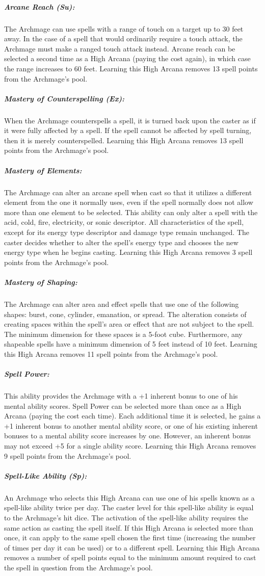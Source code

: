 \subparagraph{Arcane Reach (Su):}
The Archmage can use spells with a range of touch on a target up to 30 feet away. 
In the case of a spell that would ordinarily require a touch attack, the Archmage must make a ranged touch attack instead.
Arcane reach can be selected a second time as a High Arcana (paying the cost again), in which case the range increases to 60 feet. 
Learning this High Arcana removes 13 spell points from the Archmage's pool.

\subparagraph{Mastery of Counterspelling (Ex):}
When the Archmage counterspells a spell, it is turned back upon the caster as if it were fully affected by a  spell. 
If the spell cannot be affected by spell turning, then it is merely counterspelled. 
Learning this High Arcana removes 13 spell points from the Archmage's pool.

\subparagraph{Mastery of Elements:}
The Archmage can alter an arcane spell when cast so that it utilizes a different element from the one it normally uses, 
even if the spell normally does not allow more than one element to be selected. 
This ability can only alter a spell with the acid, cold, fire, electricity, or sonic descriptor. 
All characteristics of the spell, except for its energy type descriptor and damage type remain unchanged.
The caster decides whether to alter the spell's energy type and chooses the new energy type when he begins casting. 
Learning this High Arcana removes 3 spell points from the Archmage's pool.

\subparagraph{Mastery of Shaping:}
The Archmage can alter area and effect spells that use one of the following shapes: burst, cone, cylinder, emanation, or spread. 
The alteration consists of creating spaces within the spell's area or effect that are not subject to the spell.
The minimum dimension for these spaces is a 5-foot cube. Furthermore, any shapeable spells have a minimum dimension of 5 feet instead of 10 feet. 
Learning this High Arcana removes 11 spell points from the Archmage's pool.

\subparagraph{Spell Power:}
This ability provides the Archmage with a +1 inherent bonus to one of his mental ability scores. 
Spell Power can be selected more than once as a High Arcana (paying the cost each time). 
Each additional time it is selected, he gains a +1 inherent bonus to another mental ability score, or one of his existing inherent bonuses to a mental ability score increases by one.
However, an inherent bonus may not exceed +5 for a single ability score.
Learning this High Arcana removes 9 spell points from the Archmage's pool.

\subparagraph{Spell-Like Ability (Sp):}
An Archmage who selects this High Arcana can use one of his spells known as a spell-like ability twice per day.
The caster level for this spell-like ability is equal to the Archmage's hit dice.
The activation of the spell-like ability requires the same action as casting the spell itself.
If this High Arcana is selected more than once, it can apply to the same spell chosen the first time (increasing the number of times per day it can be used) or to a different spell.
Learning this High Arcana removes a number of spell points equal to the minimum amount required to cast the spell in question from the Archmage's pool.